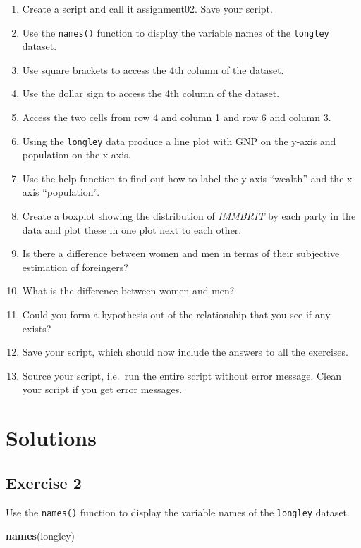 \documentclass[]{book}
\newenvironment{Shaded}{\begin{snugshade}}{\end{snugshade}}
\newcommand{\KeywordTok}[1]{\textcolor[rgb]{0.13,0.29,0.53}{\textbf{#1}}}
\newcommand{\NormalTok}[1]{#1}
\providecommand{\tightlist}{%
  \setlength{\itemsep}{0pt}\setlength{\parskip}{0pt}}
\theoremstyle{definition}
\theoremstyle{definition}
\theoremstyle{definition}
\theoremstyle{remark}
\begin{document}
\begin{enumerate}
\def\labelenumi{\arabic{enumi}.}
\tightlist
\item
  Create a script and call it assignment02. Save your script.
\item
  Use the \texttt{names()} function to display the variable names of the
  \texttt{longley} dataset.
\item
  Use square brackets to access the 4th column of the dataset.
\item
  Use the dollar sign to access the 4th column of the dataset.
\item
  Access the two cells from row 4 and column 1 and row 6 and column 3.
\item
  Using the \texttt{longley} data produce a line plot with GNP on the
  y-axis and population on the x-axis.
\item
  Use the help function to find out how to label the y-axis ``wealth''
  and the x-axis ``population''.
\item
  Create a boxplot showing the distribution of \emph{IMMBRIT} by each
  party in the data and plot these in one plot next to each other.
\item
  Is there a difference between women and men in terms of their
  subjective estimation of foreingers?
\item
  What is the difference between women and men?
\item
  Could you form a hypothesis out of the relationship that you see if
  any exists?
\item
  Save your script, which should now include the answers to all the
  exercises.
\item
  Source your script, i.e.~run the entire script without error message.
  Clean your script if you get error messages.
\end{enumerate}

\section{Solutions}\label{solutions-1}

\subsection{Exercise 2}\label{exercise-2}

Use the \texttt{names()} function to display the variable names of the
\texttt{longley} dataset.

\begin{Shaded}
\begin{Highlighting}[]
\KeywordTok{names}\NormalTok{(longley)}
\end{Highlighting}
\end{Shaded}
\end{document}
